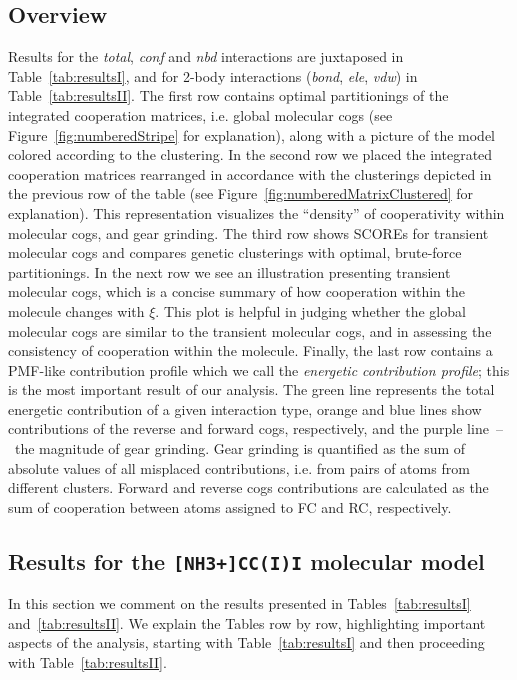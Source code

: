 \documentclass[a4paper,11pt,twoside]{book}%
\begin{document}
\subsection{Overview}
\label{sec:overview}
Results for the \emph{total}, \emph{conf} and \emph{nbd} interactions are juxtaposed in Table~\ref{tab:resultsI}, and for 2-body interactions (\emph{bond}, \emph{ele}, \emph{vdw}) in Table~\ref{tab:resultsII}.
{\color{black}
The first row contains optimal partitionings of the integrated cooperation matrices, i.e. global molecular cogs (see Figure~\ref{fig:numberedStripe} for explanation), along with a picture of the model colored according to the clustering.
In the second row we placed the integrated cooperation matrices rearranged in accordance with the clusterings depicted in the previous row of the table (see Figure~\ref{fig:numberedMatrixClustered} for explanation).
This representation visualizes the ``density'' of cooperativity within molecular cogs{\color{black},} and gear grinding.
}The {\color{black}third} row shows SCOREs for transient molecular cogs and compares genetic clusterings with optimal, brute-force partitionings.
{\color{black}In the next row we see an} illustration presenting transient molecular cogs, which is a concise summary of how cooperation within the molecule changes with $\xi$.
{\color{black}This plot is helpful in judging whether the global molecular cogs are similar to the transient molecular cogs, and in assessing the consistency of cooperation within the molecule.}
Finally, the last row contains a PMF-like contribution profile {\color{black}which we call the \emph{energetic contribution profile}}; this is the most important result of our analysis.
The green line represents the total energetic contribution of a given interaction type, orange and blue lines show contributions of the reverse and forward cogs{\color{black}, respectively}, and the purple line~--~{\color{black}the magnitude of} gear grinding.
Gear grinding is quantified as the sum of absolute values of all misplaced contributions, i.e. from pairs of atoms from different clusters.
Forward and reverse cogs contributions are calculated as the sum of cooperation between atoms assigned to FC and RC, respectively.

\subsection{Results for the {\color{black}\texttt{[NH3+]CC(I)I}} molecular model}
{\color{black}
In this section we comment on the results presented in Tables~\ref{tab:resultsI} and~\ref{tab:resultsII}.
We explain the Tables row by row, highlighting important aspects of the analysis, starting with Table~\ref{tab:resultsI} and then proceeding with Table~\ref{tab:resultsII}.
}
\end{document}
